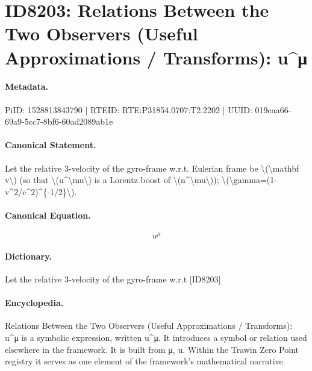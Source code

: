\section*{ID8203: Relations Between the Two Observers (Useful Approximations / Transforms): u\textasciicircum{}μ}
\paragraph{Metadata.}
PiID: 1528813843790 | RTEID: RTE:P31854.0707:T2.2202 | UUID: 019caa66-69a9-5cc7-8bf6-60ad2089ab1e

\paragraph{Canonical Statement.}
Let the relative 3-velocity of the gyro-frame w.r.t. Eulerian frame be \textbackslash{}(\textbackslash{}mathbf v\textbackslash{}) (so that \textbackslash{}(u\textasciicircum{}\textbackslash{}mu\textbackslash{}) is a Lorentz boost of \textbackslash{}(n\textasciicircum{}\textbackslash{}mu\textbackslash{})); \textbackslash{}(\textbackslash{}gamma=(1-v\textasciicircum{}2/c\textasciicircum{}2)\textasciicircum{}\{-1/2\}\textbackslash{}).

\paragraph{Canonical Equation.}
\[
u^\mu
\]

\paragraph{Dictionary.}
Let the relative 3-velocity of the gyro-frame w.r.t [ID8203]

\paragraph{Encyclopedia.}
Relations Between the Two Observers (Useful Approximations / Transforms): u\textasciicircum{}μ is a symbolic expression, written u\textasciicircum{}μ. It introduces a symbol or relation used elsewhere in the framework. It is built from μ, u. Within the Trawin Zero Point registry it serves as one element of the framework's mathematical narrative.
